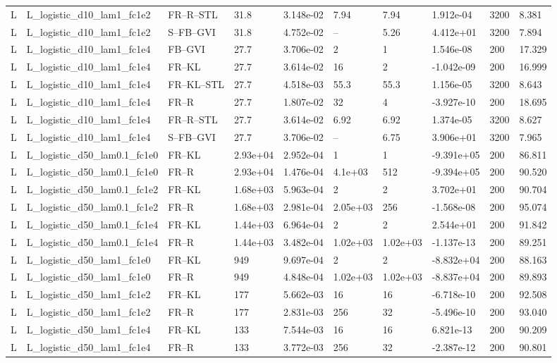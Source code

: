 \begin{tabular}{llllllllll}
L & L\_logistic\_d10\_lam1\_fc1e2 & FR--R--STL & 31.8 & 3.148e-02 & 7.94 & 7.94 & 1.912e-04 & 3200 & 8.381 \\
L & L\_logistic\_d10\_lam1\_fc1e2 & S--FB--GVI & 31.8 & 4.752e-02 & -- & 5.26 & 4.412e+01 & 3200 & 7.894 \\
L & L\_logistic\_d10\_lam1\_fc1e4 & FB--GVI & 27.7 & 3.706e-02 & 2 & 1 & 1.546e-08 & 200 & 17.329 \\
L & L\_logistic\_d10\_lam1\_fc1e4 & FR--KL & 27.7 & 3.614e-02 & 16 & 2 & -1.042e-09 & 200 & 16.999 \\
L & L\_logistic\_d10\_lam1\_fc1e4 & FR--KL--STL & 27.7 & 4.518e-03 & 55.3 & 55.3 & 1.156e-05 & 3200 & 8.643 \\
L & L\_logistic\_d10\_lam1\_fc1e4 & FR--R & 27.7 & 1.807e-02 & 32 & 4 & -3.927e-10 & 200 & 18.695 \\
L & L\_logistic\_d10\_lam1\_fc1e4 & FR--R--STL & 27.7 & 3.614e-02 & 6.92 & 6.92 & 1.374e-05 & 3200 & 8.627 \\
L & L\_logistic\_d10\_lam1\_fc1e4 & S--FB--GVI & 27.7 & 3.706e-02 & -- & 6.75 & 3.906e+01 & 3200 & 7.965 \\
L & L\_logistic\_d50\_lam0.1\_fc1e0 & FR--KL & 2.93e+04 & 2.952e-04 & 1 & 1 & -9.391e+05 & 200 & 86.811 \\
L & L\_logistic\_d50\_lam0.1\_fc1e0 & FR--R & 2.93e+04 & 1.476e-04 & 4.1e+03 & 512 & -9.394e+05 & 200 & 90.520 \\
L & L\_logistic\_d50\_lam0.1\_fc1e2 & FR--KL & 1.68e+03 & 5.963e-04 & 2 & 2 & 3.702e+01 & 200 & 90.704 \\
L & L\_logistic\_d50\_lam0.1\_fc1e2 & FR--R & 1.68e+03 & 2.981e-04 & 2.05e+03 & 256 & -1.568e-08 & 200 & 95.074 \\
L & L\_logistic\_d50\_lam0.1\_fc1e4 & FR--KL & 1.44e+03 & 6.964e-04 & 2 & 2 & 2.544e+01 & 200 & 91.842 \\
L & L\_logistic\_d50\_lam0.1\_fc1e4 & FR--R & 1.44e+03 & 3.482e-04 & 1.02e+03 & 1.02e+03 & -1.137e-13 & 200 & 89.251 \\
L & L\_logistic\_d50\_lam1\_fc1e0 & FR--KL & 949 & 9.697e-04 & 2 & 2 & -8.832e+04 & 200 & 88.163 \\
L & L\_logistic\_d50\_lam1\_fc1e0 & FR--R & 949 & 4.848e-04 & 1.02e+03 & 1.02e+03 & -8.837e+04 & 200 & 89.893 \\
L & L\_logistic\_d50\_lam1\_fc1e2 & FR--KL & 177 & 5.662e-03 & 16 & 16 & -6.718e-10 & 200 & 92.508 \\
L & L\_logistic\_d50\_lam1\_fc1e2 & FR--R & 177 & 2.831e-03 & 256 & 32 & -5.496e-10 & 200 & 93.040 \\
L & L\_logistic\_d50\_lam1\_fc1e4 & FR--KL & 133 & 7.544e-03 & 16 & 16 & 6.821e-13 & 200 & 90.209 \\
L & L\_logistic\_d50\_lam1\_fc1e4 & FR--R & 133 & 3.772e-03 & 256 & 32 & -2.387e-12 & 200 & 90.801 \\
\bottomrule
\end{tabular}
